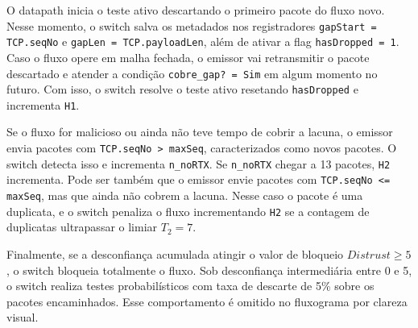 \documentclass[12pt]{article}
\begin{document}
O datapath inicia o teste ativo descartando o primeiro pacote do fluxo novo.
Nesse momento, o switch salva os metadados nos registradores \texttt{gapStart = TCP.seqNo} e \texttt{gapLen = TCP.payloadLen},
além de ativar a flag \texttt{hasDropped = 1}.
Caso o fluxo opere em malha fechada, o emissor vai retransmitir o pacote descartado e atender a condição \texttt{cobre\_gap? = Sim} em algum momento no futuro.
Com isso, o switch resolve o teste ativo resetando \texttt{hasDropped} e incrementa \texttt{H1}.

Se o fluxo for malicioso ou ainda não teve tempo de cobrir a lacuna,
o emissor envia pacotes com \texttt{TCP.seqNo > maxSeq}, caracterizados como novos pacotes.
O switch detecta isso e incrementa \texttt{n\_noRTX}.
Se \texttt{n\_noRTX} chegar a 13 pacotes, \texttt{H2} incrementa.
Pode ser também que o emissor envie pacotes com \texttt{TCP.seqNo <= maxSeq}, mas que ainda não cobrem a lacuna.
Nesse caso o pacote é uma duplicata, e o switch penaliza o fluxo incrementando \texttt{H2} se a contagem de duplicatas ultrapassar o limiar $T_2 = 7$.


Finalmente, se a desconfiança acumulada atingir o valor de bloqueio $Distrust \ge 5$, o switch bloqueia totalmente o fluxo.
Sob desconfiança intermediária entre 0 e 5,
o switch realiza testes probabilísticos com taxa de descarte de 5\% sobre os pacotes encaminhados.
Esse comportamento é omitido no fluxograma por clareza visual.
\end{document}
